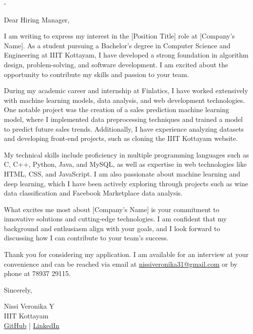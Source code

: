 \documentclass[a4paper,12pt]{letter}
\begin{document}
\begin{letter}{ - }

\opening{Dear Hiring Manager,}

I am writing to express my interest in the [Position Title] role at [Company's Name]. As a student pursuing a Bachelor's degree in Computer Science and Engineering at IIIT Kottayam, I have developed a strong foundation in algorithm design, problem-solving, and software development. I am excited about the opportunity to contribute my skills and passion to your team.

During my academic career and internship at Finlatics, I have worked extensively with machine learning models, data analysis, and web development technologies. One notable project was the creation of a sales prediction machine learning model, where I implemented data preprocessing techniques and trained a model to predict future sales trends. Additionally, I have experience analyzing datasets and developing front-end projects, such as cloning the IIIT Kottayam website.

My technical skills include proficiency in multiple programming languages such as C, C++, Python, Java, and MySQL, as well as expertise in web technologies like HTML, CSS, and JavaScript. I am also passionate about machine learning and deep learning, which I have been actively exploring through projects such as wine data classification and Facebook Marketplace data analysis.

What excites me most about [Company's Name] is your commitment to innovative solutions and cutting-edge technologies. I am confident that my background and enthusiasm align with your goals, and I look forward to discussing how I can contribute to your team’s success.

Thank you for considering my application. I am available for an interview at your convenience and can be reached via email at \href{mailto:nissiveronika31@gmail.com}{nissiveronika31@gmail.com} or by phone at 78937 29115.

\closing{Sincerely,}

Nissi Veronika Y\\
IIIT Kottayam\\
\href{https://github.com/nissi31/projects}{GitHub} \quad | \quad \href{https://www.linkedin.com/in/nissi-veronika-2543a0306/}{LinkedIn}

\end{letter}
\end{document}
